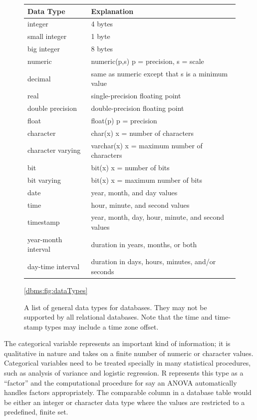 \begin{figure}
\begin{tabular}{ll}
Data Type & Explanation \\
\hline
 integer  & 4 bytes \\
 small integer & 1 byte \\
 big integer & 8 bytes\\
 numeric & numeric(p,s) p = precision, s = scale\\
 decimal & same as numeric except that s is a minimum value\\
 real & single-precision floating point\\
 double precision & double-precision floating point\\
 float & float(p) p = precision \\
 character & char(x) x = number of characters\\
 character varying & varchar(x) x = maximum number of characters\\
 bit &  bit(x) x = number of bits\\ 
 bit varying & bit(x) x = maximum number of bits \\
 date & year, month, and day values\\
 time & hour, minute, and second values\\
 timestamp & year, month, day, hour, minute, and second values\\
 year-month interval & duration in years, months, or both\\
 day-time interval & duration in days, hours, minutes, and/or seconds \\
 \end{tabular}
\caption{A list of general data types for databases. 
They may not be supported by all relational databases.
Note that the time and time-stamp types may include a time zone offset.}\ref{dbms:fig:dataTypes}
\end{figure}

The categorical variable represents an important kind of information; it 
is qualitative in nature and takes on a finite number of numeric or
character values. 
Categorical variables need to be treated specially in many statistical
procedures, such as analysis of variance and logistic regression.
R represents this type as a ``factor'' and the computational procedure 
for say an ANOVA automatically handles factors appropriately.
The comparable column in a database table would be either an integer 
or character data type where the values are restricted to a predefined,
finite set. 

